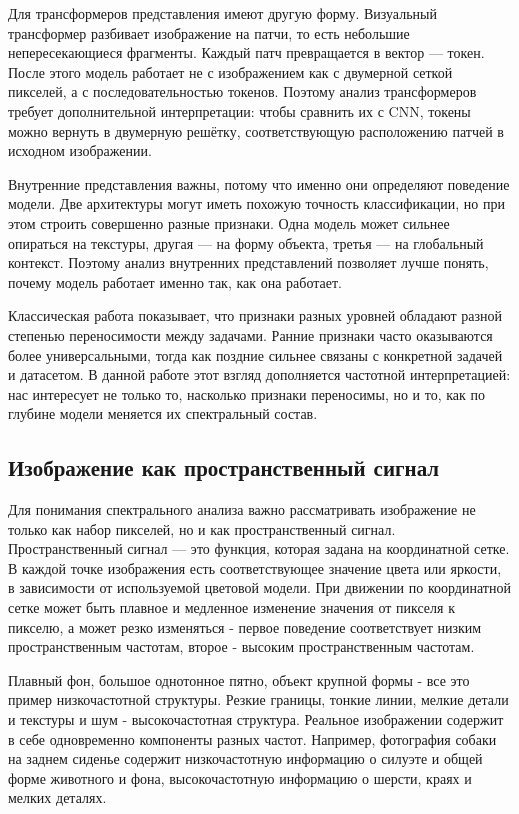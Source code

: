 Для трансформеров представления имеют другую форму. Визуальный трансформер разбивает изображение на патчи, то есть небольшие непересекающиеся фрагменты. Каждый патч превращается в вектор — токен. После этого модель работает не с изображением как с двумерной сеткой пикселей, а с последовательностью токенов. Поэтому анализ трансформеров требует дополнительной интерпретации: чтобы сравнить их с CNN, токены можно вернуть в двумерную решётку, соответствующую расположению патчей в исходном изображении.

Внутренние представления важны, потому что именно они определяют поведение модели. Две архитектуры могут иметь похожую точность классификации, но при этом строить совершенно разные признаки. Одна модель может сильнее опираться на текстуры, другая — на форму объекта, третья — на глобальный контекст. Поэтому анализ внутренних представлений позволяет лучше понять, почему модель работает именно так, как она работает.

Классическая работа \cite{yosinski2014transferable} показывает, что признаки разных уровней обладают разной степенью переносимости между задачами. Ранние признаки часто оказываются более универсальными, тогда как поздние сильнее связаны с конкретной задачей и датасетом. В данной работе этот взгляд дополняется частотной интерпретацией: нас интересует не только то, насколько признаки переносимы, но и то, как по глубине модели меняется их спектральный состав.

\subsection{Изображение как пространственный сигнал}

Для понимания спектрального анализа важно рассматривать изображение не только как набор пикселей, но и как пространственный сигнал. Пространственный сигнал — это функция, которая задана на координатной сетке. В каждой точке изображения есть соответствующее значение цвета или яркости, в зависимости от используемой цветовой модели. 
При движении по координатной сетке может быть плавное и медленное изменение значения от пикселя к пикселю, а может резко изменяться - первое поведение соответствует низким пространственным частотам, второе - высоким пространственным частотам.

Плавный фон, большое однотонное пятно, объект крупной формы - все это пример низкочастотной структуры. Резкие границы, тонкие линии, мелкие детали и текстуры и шум - высокочастотная структура. Реальное изображении содержит в себе одновременно компоненты разных частот. Например, фотография собаки на заднем сиденье содержит низкочастотную информацию о силуэте и общей форме животного и фона, высокочастотную информацию о шерсти, краях и мелких деталях.

